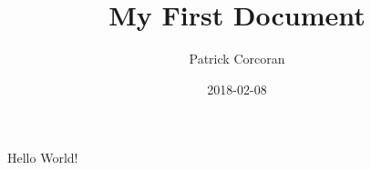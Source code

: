 \documentclass{article}
\title{My First Document}
\date{2018-02-08}
\author{Patrick Corcoran}
\begin{document}
 \maketitle
 \newpage
  
 Hello World!
\end{document}
